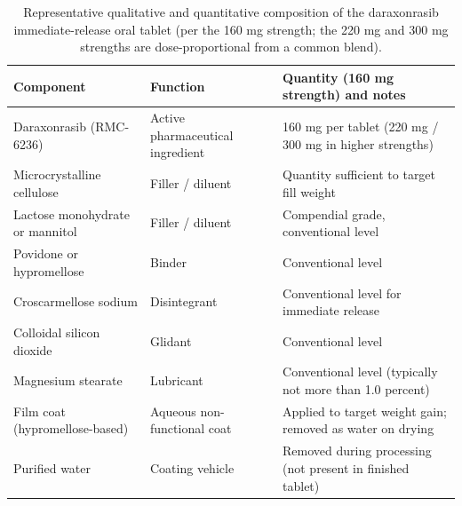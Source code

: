 \begin{table}[t]
\centering
\caption{Representative qualitative and quantitative composition of the
daraxonrasib immediate-release oral tablet (per the 160 mg strength; the 220 mg
and 300 mg strengths are dose-proportional from a common blend).}
\label{tab:cmc-dp-comp}
\begin{tabularx}{\textwidth}{L{4.4cm} L{4.6cm} Y}
\toprule
\textbf{Component} & \textbf{Function} & \textbf{Quantity (160 mg strength) and notes} \\
\midrule
Daraxonrasib (RMC-6236) & Active pharmaceutical ingredient & 160 mg per tablet (220 mg / 300 mg in higher strengths) \\
Microcrystalline cellulose & Filler / diluent & Quantity sufficient to target fill weight \\
Lactose monohydrate or mannitol & Filler / diluent & Compendial grade, conventional level \\
Povidone or hypromellose & Binder & Conventional level \\
Croscarmellose sodium & Disintegrant & Conventional level for immediate release \\
Colloidal silicon dioxide & Glidant & Conventional level \\
Magnesium stearate & Lubricant & Conventional level (typically not more than 1.0 percent) \\
Film coat (hypromellose-based) & Aqueous non-functional coat & Applied to target weight gain; removed as water on drying \\
Purified water & Coating vehicle & Removed during processing (not present in finished tablet) \\
\bottomrule
\end{tabularx}
\end{table}

